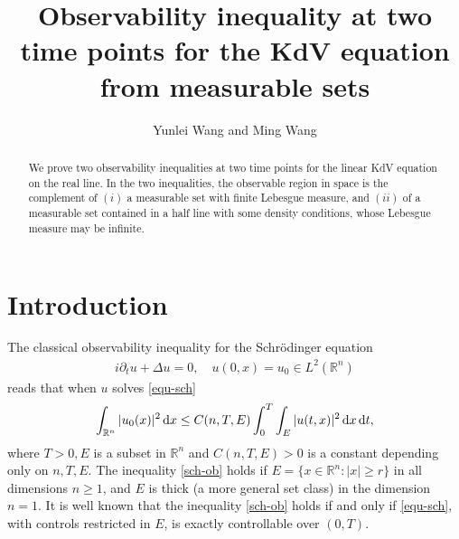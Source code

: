 \documentclass[12pt]{amsart}
\title[Observability inequality ]
{ \bf
 Observability inequality at two time points for the KdV equation  from measurable sets}
\author[Y. Wang and M. Wang]
{Yunlei Wang and Ming Wang}
\def\R {\mathbb{R}}
\def\d{{\,\rm d}}
\theoremstyle{definition}
\numberwithin{equation}{section}
\begin{document}
\begin{abstract}

We prove two observability inequalities at two time points for the linear KdV equation on the real line. In the two inequalities, the observable region in space is the complement of $(i)$ a measurable set with finite Lebesgue measure, and $(ii)$ of a measurable set contained in a half line with some density conditions, whose Lebesgue measure may be infinite.

\end{abstract}



\maketitle








\section{Introduction}

The classical observability inequality for the Schr\"{o}dinger equation
\begin{align}\label{equ-sch}
i\partial_t u+\Delta u=0, \quad u(0,x)=u_0\in L^2(\R^n)
\end{align}
reads that when $u$ solves \eqref{equ-sch}
\begin{align}\label{sch-ob}
\int_{\R^n}|u_0(x)|^2\d x\leq C(n,T,E)\int_0^T\int_E|u(t,x)|^2\d x \d t,
\end{align}
where $T>0, E$ is a subset in $\R^n$ and $C(n,T,E)>0$ is a constant depending only on $n,T,E$. The inequality \eqref{sch-ob} holds if $E=\{x\in \R^n: |x|\geq r\}$ \cite{Rosier} in all dimensions $n\geq 1$, and $E$ is thick \cite{HWW} (a more general set class) in the dimension $n=1$. It is well known that the inequality \eqref{sch-ob} holds if and only if \eqref{equ-sch}, with controls restricted in $E$, is exactly controllable over $(0,T)$.
\end{document}
